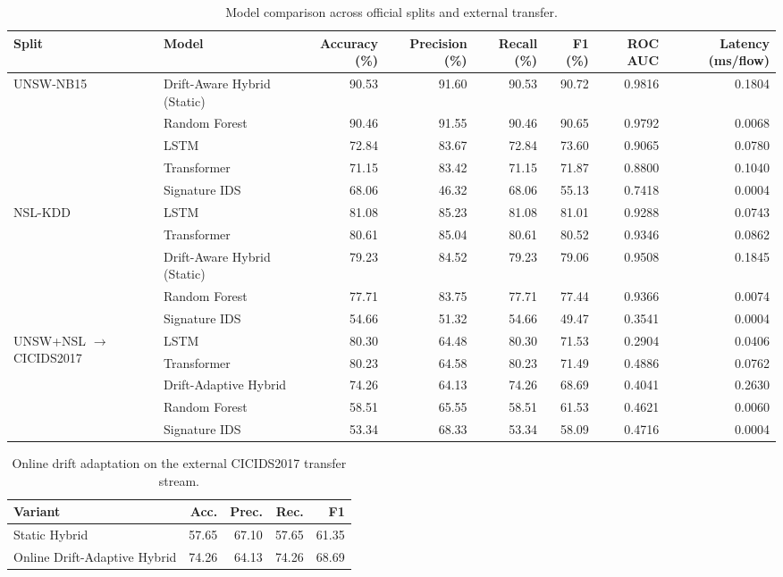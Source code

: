 \documentclass[conference]{IEEEtran}
\begin{document}
\begin{table}[t]
\caption{Model comparison across official splits and external transfer.}
\label{tab:results}
\centering
\scriptsize
\begin{tabular}{@{}llrrrrrr@{}}
\toprule
Split & Model & Accuracy (\%) & Precision (\%) & Recall (\%) & F1 (\%) & ROC AUC & Latency (ms/flow) \\
\midrule
\multirow{5}{*}{UNSW-NB15}
& Drift-Aware Hybrid (Static) & 90.53 & 91.60 & 90.53 & 90.72 & 0.9816 & 0.1804 \\
& Random Forest & 90.46 & 91.55 & 90.46 & 90.65 & 0.9792 & 0.0068 \\
& LSTM & 72.84 & 83.67 & 72.84 & 73.60 & 0.9065 & 0.0780 \\
& Transformer & 71.15 & 83.42 & 71.15 & 71.87 & 0.8800 & 0.1040 \\
& Signature IDS & 68.06 & 46.32 & 68.06 & 55.13 & 0.7418 & 0.0004 \\
\midrule
\multirow{5}{*}{NSL-KDD}
& LSTM & 81.08 & 85.23 & 81.08 & 81.01 & 0.9288 & 0.0743 \\
& Transformer & 80.61 & 85.04 & 80.61 & 80.52 & 0.9346 & 0.0862 \\
& Drift-Aware Hybrid (Static) & 79.23 & 84.52 & 79.23 & 79.06 & 0.9508 & 0.1845 \\
& Random Forest & 77.71 & 83.75 & 77.71 & 77.44 & 0.9366 & 0.0074 \\
& Signature IDS & 54.66 & 51.32 & 54.66 & 49.47 & 0.3541 & 0.0004 \\
\midrule
\multirow{5}{*}{UNSW+NSL $\rightarrow$ CICIDS2017}
& LSTM & 80.30 & 64.48 & 80.30 & 71.53 & 0.2904 & 0.0406 \\
& Transformer & 80.23 & 64.58 & 80.23 & 71.49 & 0.4886 & 0.0762 \\
& Drift-Adaptive Hybrid & 74.26 & 64.13 & 74.26 & 68.69 & 0.4041 & 0.2630 \\
& Random Forest & 58.51 & 65.55 & 58.51 & 61.53 & 0.4621 & 0.0060 \\
& Signature IDS & 53.34 & 68.33 & 53.34 & 58.09 & 0.4716 & 0.0004 \\
\bottomrule
\end{tabular}
\end{table}

\begin{table}[t]
\caption{Online drift adaptation on the external CICIDS2017 transfer stream.}
\label{tab:adaptation}
\centering
\small
\begin{tabular}{@{}lrrrr@{}}
\toprule
Variant & Acc. & Prec. & Rec. & F1 \\
\midrule
Static Hybrid & 57.65 & 67.10 & 57.65 & 61.35 \\
Online Drift-Adaptive Hybrid & 74.26 & 64.13 & 74.26 & 68.69 \\
\bottomrule
\end{tabular}
\end{table}
\end{document}
